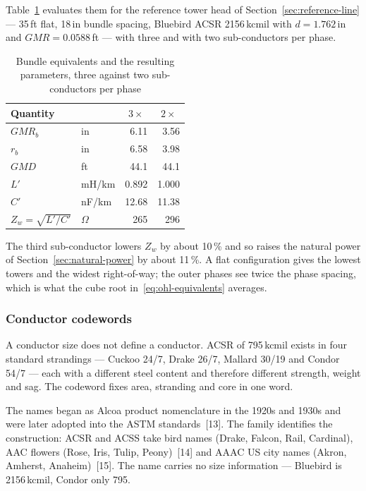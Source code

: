Table~\ref{tab:ohl-equivalents} evaluates them for the reference tower head
of Section~\ref{sec:reference-line} --- 35\,ft flat, 18\,in bundle spacing,
Bluebird ACSR 2156\,kcmil with $d = 1.762$\,in and $GMR = 0.0588$\,ft ---
with three and with two sub-conductors per phase.

\begin{table}[!ht]
  \centering
  \begin{tabular}{@{}l l r r@{}}
    \toprule
    \textbf{Quantity} & & \multicolumn{1}{c}{\textbf{$3\times$}}
      & \multicolumn{1}{c}{\textbf{$2\times$}} \\
    \midrule
    $GMR_b$ & in & 6.11 & 3.56 \\
    $r_b$   & in & 6.58 & 3.98 \\
    $GMD$   & ft & 44.1 & 44.1 \\
    \midrule
    $L'$ & mH/km & 0.892 & 1.000 \\
    $C'$ & nF/km & 12.68 & 11.38 \\
    $Z_w = \sqrt{L'/C'}$ & $\Omega$ & 265 & 296 \\
    \bottomrule
  \end{tabular}
  \caption{Bundle equivalents and the resulting parameters, three against
           two sub-conductors per phase}
  \label{tab:ohl-equivalents}
\end{table}

The third sub-conductor lowers $Z_w$ by about 10\,\% and so raises the
natural power of Section~\ref{sec:natural-power} by about 11\,\%. A flat
configuration gives the lowest towers and the widest right-of-way; the outer
phases see twice the phase spacing, which is what the cube root
in~\eqref{eq:ohl-equivalents} averages.

\subsubsection{Conductor codewords}
\label{sec:ohl-codewords}

A conductor size does not define a conductor. ACSR of 795\,kcmil exists in
four standard strandings --- Cuckoo 24/7, Drake 26/7, Mallard 30/19 and
Condor 54/7 --- each with a different steel content and therefore different
strength, weight and sag. The codeword fixes area, stranding and core in one
word.

The names began as Alcoa product nomenclature in the 1920s and 1930s and
were later adopted into the ASTM standards~[13]. The family identifies the
construction: ACSR and ACSS take bird names (Drake, Falcon, Rail, Cardinal),
AAC flowers (Rose, Iris, Tulip, Peony)~[14] and AAAC US city names (Akron,
Amherst, Anaheim)~[15]. The name carries no size information --- Bluebird is
2156\,kcmil, Condor only 795.

